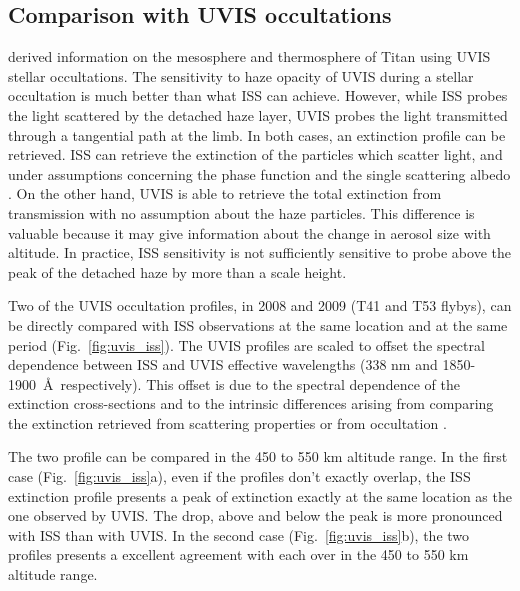 \subsection{Comparison with UVIS occultations}

\cite{Koskinen2011} derived information on the mesosphere and thermosphere of Titan using UVIS stellar
occultations. The sensitivity to haze opacity of UVIS during a stellar occultation is much better than what ISS can achieve. However,
while ISS probes the light scattered by the detached haze layer, UVIS probes the light transmitted through a tangential
path at the limb. In both cases, an extinction profile can be retrieved. ISS can retrieve the extinction of the
particles which scatter light, and under assumptions concerning the phase function and the single scattering albedo \citep{Seignovert2017, West2018}.
On the other hand, UVIS is able to retrieve the total extinction from transmission with no assumption about the haze
particles. This difference is valuable because it may give information about the change in aerosol
size with altitude. In practice, ISS sensitivity is not sufficiently sensitive to probe above
the peak of the detached haze by more than a scale height.

Two of the UVIS occultation profiles, in 2008 and 2009 (T41 and T53 flybys), can be directly compared with ISS
observations at the same location and at the same period (Fig.~\ref{fig:uvis_iss}). The UVIS profiles are scaled to
offset the spectral dependence between ISS and UVIS effective wavelengths (338 nm and 1850-1900~\AA~respectively).
This offset is due to the spectral dependence of the extinction cross-sections and to the intrinsic
differences arising from comparing the extinction retrieved from scattering properties or from occultation
\citep[see.][]{Cours2011}.

\begin{figure*}[!ht]
\caption{Comparisons between ISS and UVIS extinction profiles before the equinox.
UVIS profiles are retrieved by \cite{Koskinen2011} during the T41 (2008/02/23) and T53 (2009/04/19) flybys.
ISS profiles are retrieved for the images N1585329510\_1 (2008/03/27) and
N1618568958\_1 (2009/04/16).
The UVIS profiles are scaled by a factor 0.15 to compensate the spectral dependence of the extinction
cross section and overlap ISS retrievals.}
\label{fig:uvis_iss}
\end{figure*}

The two profile can be compared in the 450 to 550 km altitude range.
In the first case (Fig.~\ref{fig:uvis_iss}a), even if the profiles don't exactly overlap, the ISS extinction profile presents a peak of extinction exactly at the same location as the one observed by UVIS. The drop, above and below the peak is more pronounced with ISS than with UVIS.
In the second case (Fig.~\ref{fig:uvis_iss}b), the two profiles presents a excellent agreement with each over in the 450 to 550 km altitude range.

